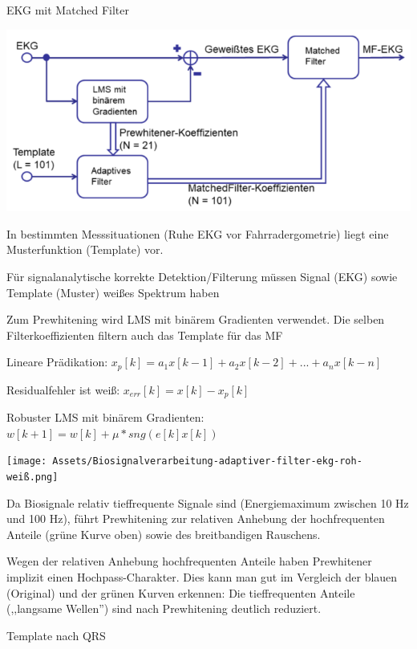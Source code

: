 \documentclass[a4paper]{article}
\begin{document}
\begin{multicols}{3}
  EKG mit Matched Filter

  \begin{itemize*}
    \item \includegraphics[width=.5\linewidth]{Assets/Biosignalverarbeitung-adaptive-filter-match-filter.png}
    \item In bestimmten Messsituationen (Ruhe EKG vor Fahrradergometrie) liegt eine Musterfunktion (Template) vor.
    \item Für signalanalytische korrekte Detektion/Filterung müssen Signal (EKG) sowie Template (Muster) weißes Spektrum haben
    \item Zum Prewhitening wird LMS mit binärem Gradienten verwendet. Die selben Filterkoeffizienten filtern auch das Template für das MF
    \item Lineare Prädikation: $x_p[k]=a_1x[k-1]+a_2x[k-2]+...+a_nx[k-n]$
    \item Residualfehler ist weiß: $x_{err}[k]=x[k]-x_p[k]$
    \item Robuster LMS mit binärem Gradienten: $w[k+1]=w[k]+\mu*sng(e[k]x[k])$
  \end{itemize*}

  \texttt{[image: Assets/Biosignalverarbeitung-adaptiver-filter-ekg-roh-weiß.png]}

  \begin{itemize*}
    \item Da Biosignale relativ tieffrequente Signale sind (Energiemaximum zwischen 10 Hz und 100 Hz), führt Prewhitening zur relativen Anhebung der hochfrequenten Anteile (grüne Kurve oben) sowie des breitbandigen Rauschens.
    \item Wegen der relativen Anhebung hochfrequenten Anteile haben Prewhitener implizit einen Hochpass-Charakter. Dies kann man gut im Vergleich der blauen (Original) und der grünen Kurven erkennen: Die tieffrequenten Anteile (,,langsame Wellen'') sind nach Prewhitening deutlich reduziert.
  \end{itemize*}

  Template nach QRS


\end{multicols}
\end{document}
